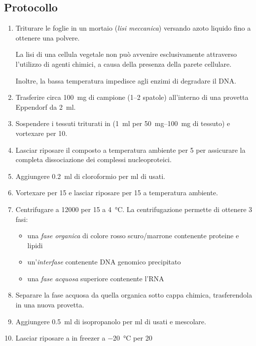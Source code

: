 \subsection{Protocollo}
\begin{enumerate}
	\item Triturare le foglie in un mortaio (\textit{lisi meccanica}) versando azoto liquido fino a ottenere una polvere.
	      \begin{Note}
		      La lisi di una cellula vegetale non può avvenire esclusivamente attraverso l’utilizzo di agenti chimici, a causa della presenza della parete cellulare.

		      Inoltre, la bassa temperatura impedisce agli enzimi di degradare il DNA.
	      \end{Note}
	\item Trasferire circa \qty{100}{\mg} di campione (\numrange{1}{2} spatole) all’interno di una provetta \foreignlanguage{german}{Eppendorf} da \qty{2}{\ml}.
	\item Sospendere i tessuti triturati in \trizol (\qty{1}{ml} per \qtyrange{50}{100}{\mg} di tessuto) e vortexare per \qty{10}{\sec}.
	\item Lasciar riposare il composto a temperatura ambiente per \qty{5}{\min} per assicurare la completa dissociazione dei complessi nucleoproteici.
	\item Aggiungere \qty{0.2}{\ml} di cloroformio per ml di \trizol usati.
	\item Vortexare per \qty{15}{\sec} e lasciar riposare per \qty{15}{\min} a temperatura ambiente.
	\item Centrifugare a \qty{12000}{\giri} per \qty{15}{\min} a \qty{4}{\celsius}. La centrifugazione permette di ottenere 3 fasi:
	      \begin{itemize}
		      \item una \emph{fase organica} di colore rosso scuro/marrone contenente proteine e lipidi
		      \item un’\emph{interfase} contenente DNA genomico precipitato
		      \item una \emph{fase acquosa} superiore contenente l’RNA
	      \end{itemize}
	\item Separare la fase acquosa da quella organica sotto cappa chimica, trasferendola in una nuova provetta.
	\item Aggiungere \qty{0.5}{ml} di isopropanolo per \unit{\ml} di \trizol usati e mescolare.
	\item Lasciar riposare a in freezer a \qty{-20}{\celsius} per \qty{20}{\min}

\end{enumerate}
